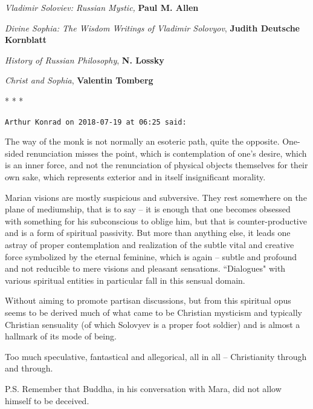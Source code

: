 \emph{Vladimir Soloviev: Russian Mystic,}\textbf{ Paul M. Allen}

\emph{Divine Sophia: The Wisdom Writings of Vladimir Solovyov}, \textbf{Judith Deutsche Kornblatt}

\emph{History of Russian Philosophy}, \textbf{N. Lossky}

\emph{Christ and Sophia}, \textbf{Valentin Tomberg}




\begin{center}* * *\end{center}

\begin{footnotesize}\begin{sffamily}



\texttt{Arthur Konrad on 2018-07-19 at 06:25 said: }

The way of the monk is not normally an esoteric path, quite the opposite. One-sided renunciation misses the point, which is contemplation of one's desire, which is an inner force, and not the renunciation of physical objects themselves for their own sake, which represents exterior and in itself insignificant morality.

Marian visions are mostly suspicious and subversive. They rest somewhere on the plane of mediumship, that is to say – it is enough that one becomes obsessed with something for his subconscious to oblige him, but that is counter-productive and is a form of spiritual passivity. But more than anything else, it leads one astray of proper contemplation and realization of the subtle vital and creative force symbolized by the eternal feminine, which is again – subtle and profound and not reducible to mere visions and pleasant sensations. ``Dialogues" with various spiritual entities in particular fall in this sensual domain. 

Without aiming to promote partisan discussions, but from this spiritual opus seems to be derived much of what came to be Christian mysticism and typically Christian sensuality (of which Solovyev is a proper foot soldier) and is almost a hallmark of its mode of being. 

Too much speculative, fantastical and allegorical, all in all – Christianity through and through. 

P.S. Remember that Buddha, in his conversation with Mara, did not allow himself to be deceived.



\end{sffamily}
\end{footnotesize}
